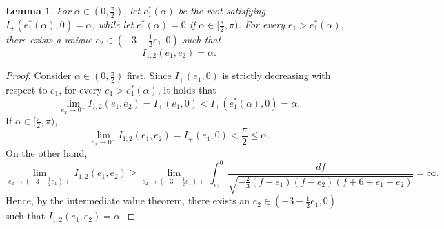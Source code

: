 \documentclass[reqno,12pt]{amsart}
\newtheorem{lemma}[theorem]{Lemma}
\begin{document}
\begin{lemma}\label{Lemmatype12-1}
  For $\alpha\in (0,\frac{\pi}{2})$, let $e_1^*(\alpha)$ be the root satisfying $I_{+}(e_1^*(\alpha), 0) = \alpha $, while let $e_1^*(\alpha) = 0$ if $ \alpha\in[\frac{\pi}{2}, \pi)$.  For every $e_1 > e_1^*(\alpha)$, there exists a unique $e_2\in \left(-3 - \frac12 e_1, 0\right)$ such that 
    \begin{equation*}
        I_{1, 2}(e_1, e_2) = \alpha.
    \end{equation*}
\end{lemma}
\begin{proof}
Consider $\alpha\in (0,\frac{\pi}{2})$ first. Since  $I_+(e_1,0)$ is strictly decreasing with respect to $e_1$,  for every $e_1 > e_1^*(\alpha)$, it holds that 
    \begin{equation}\nonumber
       \lim_{e_2 \rightarrow 0^-} I_{1, 2}(e_1, e_2) = I_{+}(e_1, 0) < I_{+}(e_1^*(\alpha), 0)= \alpha .
    \end{equation}
    If $ \alpha\in[\frac{\pi}{2}, \pi)$,
    \begin{equation}\nonumber
       \lim_{e_2 \rightarrow 0^-} I_{1, 2}(e_1, e_2) = I_{+}(e_1, 0) < \frac{\pi}{2}\leq \alpha .
    \end{equation}
On the other hand, 
\begin{equation}\nonumber
    \lim_{e_2 \rightarrow (-3 -\frac12 e_1)+} I_{1,2}(e_1, e_2) \geq \lim_{e_2 \rightarrow (-3 -\frac12 e_1)+} \int_{e_2}^0 \frac{df}{\sqrt{-\frac23 (f- e_1) (f-e_2) (f+6+e_1+e_2)}} =\infty. 
\end{equation}
Hence, by the intermediate value theorem, there exists an $e_2 \in (-3 -\frac12 e_1, 0)$ such that $I_{1,2}(e_1, e_2)=\alpha.$   



\end{proof}
\end{document}
